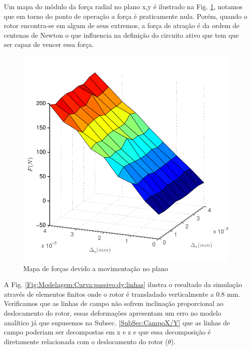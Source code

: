 Um mapa do módulo da força radial no plano x,y é ilustrado na Fig. \ref{fig:passivo_otimizado_fem_plano}, notamos que em torno do ponto de operação a força é praticamente nula. Porém, quando o rotor encontra-se em algum de seus extremos, a força de atração é da ordem de centenas de Newton o que influencia na definição do circuito ativo que tem que ser capaz de vencer essa força.

\begin{figure}[!ht]
\centering
\includegraphics[width=0.7\linewidth]{Figs/Simulacoes/Passivo2/passivo_otimizado_fem_plano}
\caption{Mapa de forças devido a movimentação no plano}
\label{fig:passivo_otimizado_fem_plano}
\end{figure} 

A Fig. \ref{Fig:Modelagem:Curva:passivo:dy:linhas} ilustra o resultado da simulação através de elementos finitos onde o rotor é transladado verticalmente a 0.8 mm. Verificamos que as linhas de campo não sofrem inclinação proporcional ao deslocamento do rotor, essas deformações apresentam um erro no modelo analítico já que supusemos na Subsec. \ref{SubSec:CampoX/Y} que as linhas de campo poderiam ser decompostas em x e z e que essa decomposição é diretamente relacionada com o deslocamento do rotor ($\theta$). 

